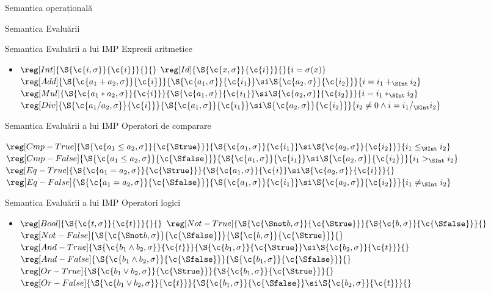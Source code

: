 \documentclass[xcolor=pdftex,romanian,colorlinks]{beamer}
\begin{document}
\begin{section}{Semantica operațională}
\begin{subsection}{Semantica Evaluării}
\begin{frame}{Semantica Evaluării a lui IMP}
{Expresii aritmetice}
\begin{itemize}
\item[] $\reg[Int]{\S{\c{i,\sigma}}{\c{i}}}{}{}$
\vitem[] $\reg[Id]{\S{\c{x,\sigma}}{\c{i}}}{}{i = \sigma(x)}$
\vitem[] $\reg[Add]{\S{\c{a_1 + a_2,\sigma}}{\c{i}}}{\S{\c{a_1,\sigma}}{\c{i_1}}\si\S{\c{a_2,\sigma}}{\c{i_2}}}{i = i_1 +_{\SInt} i_2}$
\vitem[] $\reg[Mul]{\S{\c{a_1 * a_2,\sigma}}{\c{i}}}{\S{\c{a_1,\sigma}}{\c{i_1}}\si\S{\c{a_2,\sigma}}{\c{i_2}}}{i = i_1 *_{\SInt} i_2}$
\vitem[] $\reg[Div]{\S{\c{a_1 / a_2,\sigma}}{\c{i}}}{\S{\c{a_1,\sigma}}{\c{i_1}}\si\S{\c{a_2,\sigma}}{\c{i_2}}}{i_2 \neq 0 \wedge i = i_1 /_{\SInt} i_2}$
\end{itemize}
\end{frame}
\begin{frame}{Semantica Evaluării a lui IMP}
{Operatori de comparare}
\begin{itemize}
\vitem[] $\reg[Cmp-True]{\S{\c{a_1 \leq a_2,\sigma}}{\c{\Strue}}}{\S{\c{a_1,\sigma}}{\c{i_1}}\si\S{\c{a_2,\sigma}}{\c{i_2}}}{i_1 \leq_{\SInt} i_2}$
\vitem[] $\reg[Cmp-False]{\S{\c{a_1 \leq a_2,\sigma}}{\c{\Sfalse}}}{\S{\c{a_1,\sigma}}{\c{i_1}}\si\S{\c{a_2,\sigma}}{\c{i_2}}}{i_1 >_{\SInt} i_2}$
\vitem[] $\reg[Eq-True]{\S{\c{a_1 = a_2,\sigma}}{\c{\Strue}}}{\S{\c{a_1,\sigma}}{\c{i}}\si\S{\c{a_2,\sigma}}{\c{i}}}{}$
\vitem[] $\reg[Eq-False]{\S{\c{a_1 = a_2,\sigma}}{\c{\Sfalse}}}{\S{\c{a_1,\sigma}}{\c{i_1}}\si\S{\c{a_2,\sigma}}{\c{i_2}}}{i_1 \neq_{\SInt} i_2}$
\end{itemize}
\end{frame}
\begin{frame}{Semantica Evaluării a lui IMP}
{Operatori logici}
\begin{itemize}
\item[] $\reg[Bool]{\S{\c{t,\sigma}}{\c{t}}}{}{}$
\vitem[] $\reg[Not-True]{\S{\c{\Snot b,\sigma}}{\c{\Strue}}}{\S{\c{b,\sigma}}{\c{\Sfalse}}}{}$
\hfill
$\reg[Not-False]{\S{\c{\Snot b,\sigma}}{\c{\Sfalse}}}{\S{\c{b,\sigma}}{\c{\Strue}}}{}$
\vitem[] $\reg[And-True]{\S{\c{b_1 \wedge b_2,\sigma}}{\c{t}}}{\S{\c{b_1,\sigma}}{\c{\Strue}}\si\S{\c{b_2,\sigma}}{\c{t}}}{}$
\vitem[] $\reg[And-False]{\S{\c{b_1 \wedge b_2,\sigma}}{\c{\Sfalse}}}{\S{\c{b_1,\sigma}}{\c{\Sfalse}}}{}$
\vitem[] $\reg[Or-True]{\S{\c{b_1 \vee b_2,\sigma}}{\c{\Strue}}}{\S{\c{b_1,\sigma}}{\c{\Strue}}}{}$
\vitem[] $\reg[Or-False]{\S{\c{b_1 \vee b_2,\sigma}}{\c{t}}}{\S{\c{b_1,\sigma}}{\c{\Sfalse}}\si\S{\c{b_2,\sigma}}{\c{t}}}{}$
\end{itemize}

\end{frame}
\end{subsection}
\end{section}
\end{document}
